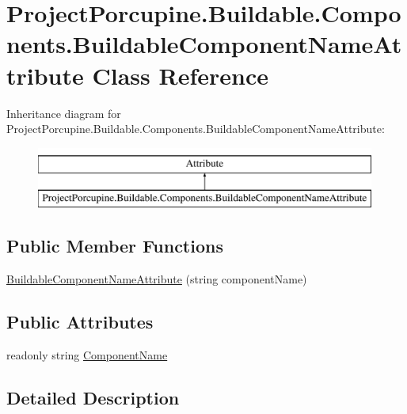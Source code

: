 \hypertarget{class_project_porcupine_1_1_buildable_1_1_components_1_1_buildable_component_name_attribute}{}\section{Project\+Porcupine.\+Buildable.\+Components.\+Buildable\+Component\+Name\+Attribute Class Reference}
\label{class_project_porcupine_1_1_buildable_1_1_components_1_1_buildable_component_name_attribute}
Inheritance diagram for Project\+Porcupine.\+Buildable.\+Components.\+Buildable\+Component\+Name\+Attribute\+:\begin{figure}[H]
\begin{center}
\leavevmode
\includegraphics[height=2.000000cm]{class_project_porcupine_1_1_buildable_1_1_components_1_1_buildable_component_name_attribute}
\end{center}
\end{figure}
\subsection*{Public Member Functions}
\begin{DoxyCompactItemize}
\item 
\hyperlink{class_project_porcupine_1_1_buildable_1_1_components_1_1_buildable_component_name_attribute_a47e951a16b97d3541bdfe5b3a7798894}{Buildable\+Component\+Name\+Attribute} (string component\+Name)
\end{DoxyCompactItemize}
\subsection*{Public Attributes}
\begin{DoxyCompactItemize}
\item 
readonly string \hyperlink{class_project_porcupine_1_1_buildable_1_1_components_1_1_buildable_component_name_attribute_aa21da0c19dc286f7617c26292a53eaa8}{Component\+Name}
\end{DoxyCompactItemize}


\subsection{Detailed Description}


